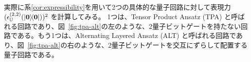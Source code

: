 

実際に系\ref{cor:expressibility}を用いて2つの具体的な量子回路に対して表現力 $(\epsilon_{\bbU}^{(2,2)}(\dyad{\bs{0}}))^2$ を計算してみる。
1つは、Tensor Product Ansatz (TPA) と呼ばれる回路であり、図~\ref{fig:tpa-alt}の左のような、2量子ビットゲートを持たない回路である。もう1つは、Alternating Layered Ansatz (ALT) と呼ばれる回路であり、図~\ref{fig:tpa-alt}の右のような、2量子ビットゲートを交互にずらして配置する量子回路である。

\begin{figure}[H]
    \centering
\end{figure}
